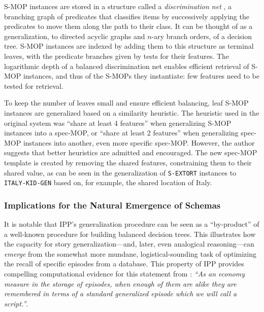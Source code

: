 S-MOP instances are stored in a structure called a \textit{discrimination net} \citep{Charniak:1980:AIP:576572}, a branching graph of predicates that classifies items by successively applying the predicates to move them along the path to their class. It can be thought of as a generalization, to directed acyclic graphs and $n$-ary branch orders, of a decision tree. S-MOP instances are indexed by adding them to this structure as terminal leaves, with the predicate branches given by tests for their features. The logarithmic depth of a balanced discrimination net enables efficient retrieval of S-MOP instances, and thus of the S-MOPs they instantiate: few features need to be tested for retrieval.

To keep the number of leaves small and ensure efficient balancing, leaf S-MOP instances are generalized based on a similarity heuristic. The heuristic used in the original system was ``share at least 4 features'' when generalizing S-MOP instances into a spec-MOP, or ``share at least 2 features'' when generalizing spec-MOP instances into another, even more specific spec-MOP. However, the author suggests that better heuristics are admitted and encouraged. The new spec-MOP template is created by removing the shared features, constraining them to their shared value, as can be seen in the generalization of \texttt{S-EXTORT} instances to \texttt{ITALY-KID-GEN} based on, for example, the shared location of Italy.

\subsubsection{Implications for the Natural Emergence of Schemas}
It is notable that IPP's generalization procedure can be seen as a ``by-product'' of a well-known procedure for building balanced decision trees.
This illustrates how the capacity for story generalization---and, later, even analogical reasoning---can \textit{emerge} from the somewhat more mundane, logistical-sounding task of optimizing the recall of specific episodes from a database. This property of IPP provides compelling computational evidence for this statement from \citep{schankandabelson}: \textit{``As an economy measure in the storage of episodes, when enough of them are alike they are remembered in terms of a standard generalized episode which we will call a script.''}.

